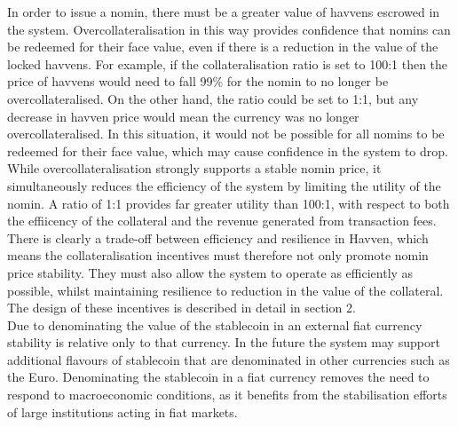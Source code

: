 
\noindent In order to issue a nomin, there must be a greater value of havvens escrowed in the system. Overcollateralisation in this way provides confidence that nomins can be redeemed for their face value, even if there is a reduction in the value of the locked havvens. For example, if the collateralisation ratio is set to 100:1 then the price of havvens would need to fall 99\% for the nomin to no longer be overcollateralised. On the other hand, the ratio could be set to 1:1, but any decrease in havven price would mean the currency was no longer overcollateralised. In this situation, it would not be possible for all nomins to be redeemed for their face value, which may cause confidence in the system to drop.  \\

\noindent While overcollateralisation strongly supports a stable nomin price, it simultaneously reduces the efficiency of the system by limiting the utility of the nomin. A ratio of 1:1 provides far greater utility than 100:1, with respect to both the effiicency of the collateral and the revenue generated from transaction fees. There is clearly a trade-off between efficiency and resilience in Havven, which means the collateralisation incentives must therefore not only promote nomin price stability. They must also allow the system to operate as efficiently as possible, whilst maintaining resilience to reduction in the value of the collateral. The design of these incentives is described in detail in section 2. \\

\noindent Due to denominating the value of the stablecoin in an external fiat currency stability is relative only to that currency. In the future the system may support additional flavours of stablecoin that are denominated in other currencies such as the Euro. Denominating the stablecoin in a fiat currency removes the need to respond to macroeconomic conditions, as it benefits from the stabilisation efforts of large institutions acting in fiat markets. \\

\pagebreak
